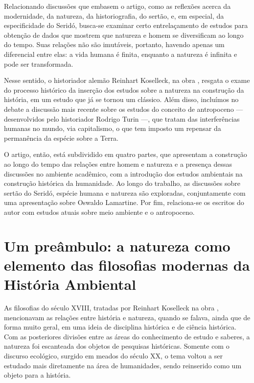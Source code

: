 \begin{refsection}
    Relacionando discussões que embasem o artigo, como as reflexões acerca da modernidade, da natureza, da historiografia, do sertão, e, em especial, da especificidade do Seridó, busca-se examinar certo entrelaçamento de estudos para obtenção de dados que mostrem que natureza e homem se diversificam ao longo do tempo. Suas relações não são imutáveis, portanto, havendo apenas um diferencial entre elas: a vida humana é finita, enquanto a natureza é infinita e pode ser transformada. 

    Nesse sentido, o historiador alemão Reinhart Koselleck, na obra , resgata o exame do processo histórico da inserção dos estudos sobre a natureza na construção da história, em um estudo que já se tornou um clássico. Além disso, incluímos no debate a discussão mais recente sobre os estudos do conceito de antropoceno --- desenvolvidos pelo historiador Rodrigo Turin ---, que tratam das interferências humanas no mundo, via capitalismo, o que tem imposto um repensar da permanência da espécie sobre a Terra.  

    O artigo, então, está subdividido em quatro partes, que apresentam a construção ao longo do tempo das relações entre homem e natureza e a presença dessas discussões no ambiente acadêmico, com a introdução dos estudos ambientais na construção histórica da humanidade. Ao longo do trabalho, as discussões sobre sertão do Seridó, espécie humana e natureza são exploradas, conjuntamente com uma apresentação sobre Oswaldo Lamartine. Por fim, relaciona-se os escritos do autor com estudos atuais sobre meio ambiente e o antropoceno. 


    \section{Um preâmbulo: a natureza como elemento das filosofias modernas da História Ambiental}

    As filosofias do século XVIII, tratadas por Reinhart Koselleck na obra , mencionavam as relações entre história e natureza, quando se falava, ainda que de forma muito geral, em uma ideia de disciplina histórica e de ciência histórica. Com as posteriores divisões entre as áreas do conhecimento de estudo e saberes, a natureza foi escanteada dos objetos de pesquisas históricas. Somente com o discurso ecológico, surgido em meados do século XX, o tema voltou a ser estudado mais diretamente na área de humanidades, sendo reinserido como um objeto para a história. 


\end{refsection}
